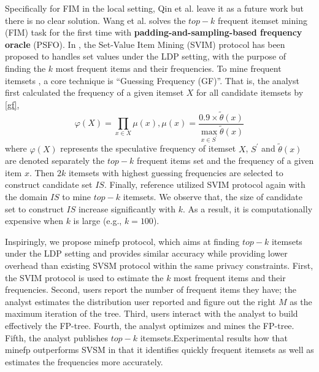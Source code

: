\documentclass[conference]{IEEEtran}
\begin{document}
Specifically for FIM in the local setting, Qin et al.\cite{a1} leave it as a future work but there is no clear solution. Wang et al.\cite{a2} solves  the $top-k$ frequent itemset mining (FIM) task for the first time with \textbf{padding-and-sampling-based frequency oracle} (PSFO). In \cite{a2}, the Set-Value Item Mining (SVIM) protocol has been proposed to handles set values under the LDP setting, with the purpose of finding the $k$ most frequent items and their frequencies. To mine frequent itemsets , a core technique is {\color{red}``Guessing Frequency (GF)''}. That is, the analyst first calculated  the frequency of a given itemset $X$ for all candidate itemsets by \eqref{gf},
\begin{equation}
\varphi(X)=\prod_{x \in X} \mu(x) , \mu(x) = \frac{0.9\times \tilde{\theta}(x)}{\max \limits_{x \in S^{\prime}} \tilde{\theta}(x)}\label{gf}
\end{equation}
where $\varphi(X)$ represents the speculative frequency of itemset $X$, $S^{\prime}$ and $\tilde{\theta}(x)$ are denoted separately the $top-k$ frequent items set and the frequency of a given item $x$. Then $2k$ itemsets with highest guessing frequencies are selected to construct candidate set $IS$. Finally, reference \cite{a2} utilized SVIM protocol again with the domain $IS$ to mine $top-k$ itemsets. We observe that, the size of candidate set to construct $IS$ increase significantly with $k$. As a result, it is computationally expensive when $k$ is large (e.g., $k=100$). 

Inspiringly, we propose {\color{red}minefp} protocol, which aims at finding $top-k$ itemsets under the LDP setting and provides similar accuracy while providing lower overhead than existing SVSM protocol within the same privacy constraints.
First, the SVIM protocol is used to estimate the $k$ most frequent items and their frequencies. Second, users report the number of frequent items they have; the analyst estimates the distribution user reported and figure out the right $M$ as the maximum iteration of the tree. Third, users interact with the analyst to build effectively the FP-tree\cite{fp}. Fourth, the analyst optimizes and mines the FP-tree. Fifth, the analyst publishes $top-k$ itemsets.Experimental results how that {\color{red}minefp
outperforms SVSM in that it identifies quickly frequent itemsets as well as estimates the frequencies more accurately.}
\end{document}
